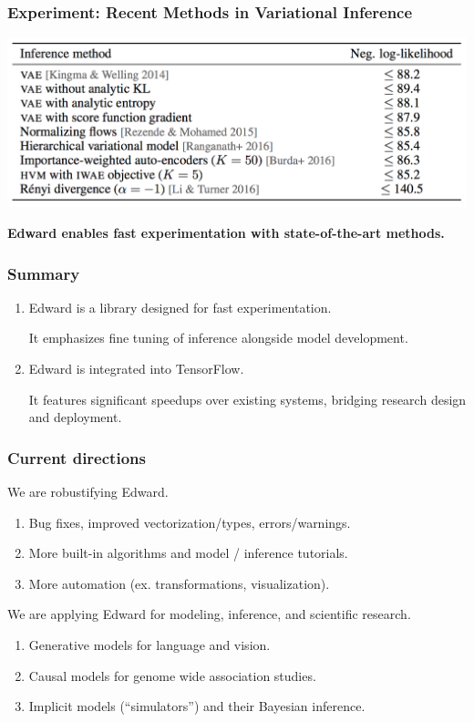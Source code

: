 \documentclass[10pt,
               xcolor={usenames,dvipsnames},
               hyperref={colorlinks,linktoc=all,citecolor=Plum,linkcolor=MidnightBlue,urlcolor=MidnightBlue},noamssymb]{beamer}
\begin{document}
\begin{frame}
\frametitle{Experiment: Recent Methods in Variational Inference}
\begin{center}
\includegraphics[height=0.4\textwidth]{img/experiments_vi.png}
\end{center}
\vspace{2ex}
\textbf{Edward enables fast experimentation with state-of-the-art methods.}
\end{frame}

\begin{frame}[c]
\frametitle{Summary}
\begin{enumerate}
\item
Edward is a library designed for fast experimentation.

It emphasizes fine tuning of inference alongside model development.
\item
Edward is integrated into TensorFlow.

It features significant speedups over existing systems, bridging
research design and deployment.
\end{enumerate}
\end{frame}

\begin{frame}
\frametitle{Current directions}

We are robustifying Edward.
\begin{enumerate}
\item Bug fixes, improved vectorization/types, errors/warnings.
\item More built-in algorithms and model / inference tutorials.
\item More automation (ex. transformations, visualization).
\end{enumerate}
\vspace{3ex}

We are applying Edward for modeling, inference, and scientific research.
\begin{enumerate}
\vspace{-1.5ex}
\item
Generative models for language and vision.
\item
Causal models for genome wide association studies. 
\item
Implicit models (``simulators'') and their Bayesian inference.
\end{enumerate}
\end{frame}
\end{document}

